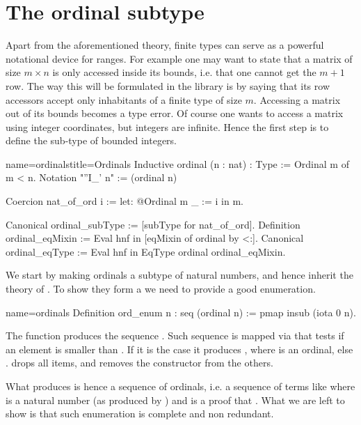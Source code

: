 \section{The ordinal subtype}\label{sec:ordfintype}

Apart from the aforementioned theory, finite types can serve as a
powerful notational device for ranges.  For example one may want
to state that a matrix of size $m \times n$ is only accessed inside
its bounds, i.e. that one cannot get the $m+1$ row.  The way this will
be formulated in the \mcbMC{} library is by saying that its row
accessors accept only inhabitants of a finite type of size $m$.
Accessing a matrix out of its bounds becomes a type error.
Of course one wants to access a matrix using integer coordinates, but
integers are infinite.  Hence the first step is to define the sub-type
of bounded integers.

\begin{coq}{name=ordinals}{title=Ordinals}
Inductive ordinal (n : nat) : Type := Ordinal m of m < n.
Notation "''I_' n" := (ordinal n)

Coercion nat_of_ord i := let: @Ordinal m _ := i in m.

Canonical ordinal_subType := [subType for nat_of_ord].
Definition ordinal_eqMixin := Eval hnf in [eqMixin of ordinal by <:].
Canonical ordinal_eqType := Eval hnf in EqType ordinal ordinal_eqMixin.
\end{coq}

We start by making ordinals a subtype of natural numbers, and hence
inherit the theory of .  To show they form a 
we need to provide a good enumeration.

\begin{coq}{name=ordinals}{}
Definition ord_enum n : seq (ordinal n) := pmap insub (iota 0 n).
\end{coq}

The  function produces the sequence \C{[:: 0, 1, ... n.-1]}.
Such sequence is mapped via  that tests if an element 
is smaller than .  If it is the case it produces ,
where  is an ordinal, else .   drops all 
items, and removes the  constructor from the others.

What  produces is hence a sequence of ordinals, i.e.
a sequence of terms like  where  is a natural
number (as produced by ) and  is a proof that .  What we are left to show is that such enumeration is complete
and non redundant.

